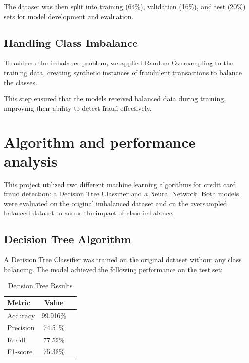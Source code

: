 \documentclass[11pt]{article}
\begin{document}
The dataset was then split into training (64\%), validation (16\%), and test (20\%) sets for model development and evaluation.

\subsection{Handling Class Imbalance}

To address the imbalance problem, we applied Random Oversampling to the training data, creating synthetic instances of fraudulent transactions to balance the classes. 

This step ensured that the models received balanced data during training, improving their ability to detect fraud effectively.

\section{Algorithm and performance analysis}
This project utilized two different machine learning algorithms for credit card fraud detection: a Decision Tree Classifier and a Neural Network. Both models were evaluated on the original imbalanced dataset and on the oversampled balanced dataset to assess the impact of class imbalance.

\subsection{Decision Tree Algorithm}
 
A Decision Tree Classifier was trained on the original dataset without any class balancing. The model achieved the following performance on the test set:

\begin{table}[H]
  \centering
  \caption{Decision Tree Results}
  \label{tab:decision_tree}
  \begin{tabular}{lcc}
       \toprule
       Metric & Value \\
       \midrule
       Accuracy &  99.916\% \\
       Precision &  74.51\% \\
       Recall &  77.55\%  \\
       F1-score &  75.38\% \\              
       \bottomrule
 \end{tabular}
\end{table} 
\end{document}
